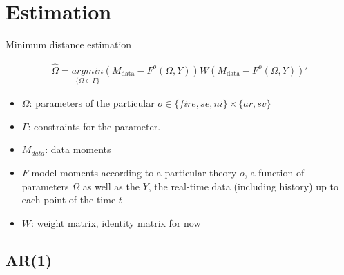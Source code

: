 \documentclass{beamer}
\begin{document}
\section{Estimation}
\begin{frame}{Minimum distance estimation}
	
	\begin{eqnarray*}
	\widehat \Omega = \underset{\{\Omega \in \Gamma\} }{argmin} (M_{\textrm{data} } - F^{o}(\Omega, Y)) W  (M_{\textrm{data} } - F^{o}(\Omega, Y))'
	\end{eqnarray*}
	
	\begin{itemize}
		\item  $\Omega$: parameters of the particular $o \in \{{fire}, {se}, {ni} \} \times \{ar, sv\}$
		\item  $\Gamma$: constraints for the parameter. 
		\item $M_{data}$: data moments
		\item $F$ model moments according to a particular theory $o$, a function of parameters $\Omega$ as well as the $Y$, the real-time data (including history) up to each point of the time $t$
		\item  $W$: weight matrix, identity matrix for now 
	\end{itemize}
		
\end{frame}

\subsection{AR(1)}
\end{document}
